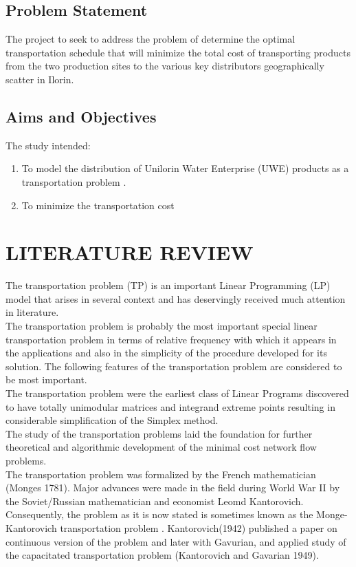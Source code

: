 \documentclass[12pt]{report}
\newcommand{\NI}{\noindent}
\newcommand{\stp}{transportation problem }
\newcommand{\stps}{transportation problems }
\begin{document}
	\section{Problem Statement}
	The project to seek to address the problem of determine the optimal transportation schedule that will minimize the total cost of transporting products from the two production sites to the various key distributors geographically scatter in Ilorin. 

	\section{Aims and Objectives}
	The study intended:
	\begin{enumerate}
		\item To model the distribution of Unilorin Water Enterprise (UWE) products as a \stp.
		\item To minimize the transportation cost
	\end{enumerate}
	
	
	\chapter{LITERATURE REVIEW}
	The \stp (TP) is an important Linear Programming (LP) model that arises in several context and has deservingly received much attention in literature.\\
	
	\NI The \stp is probably the most important special linear \stp in terms of relative frequency with which it appears in the applications and also in the simplicity of the procedure developed for its solution. The following features of the transportation problem are considered to be most important.\\
	
	\NI The \stp were the earliest class of Linear Programs discovered to have totally unimodular matrices and integrand extreme points resulting in considerable simplification of the Simplex method.\\
	
	\NI The study of the \stps laid the foundation for further theoretical and algorithmic development of the minimal cost network flow problems.\\
	
	\NI The \stp was formalized by the French mathematician (Monges 1781). Major advances were made in the field during World War II by the Soviet/Russian mathematician and economist Leomd Kantorovich. Consequently, the problem as it is now stated is sometimes known as the Monge-Kantorovich \stp. Kantorovich(1942) published a paper on continuous version of the problem and later with Gavurian, and applied study of the capacitated transportation problem (Kantorovich and Gavarian 1949).\\
	
\end{document}
